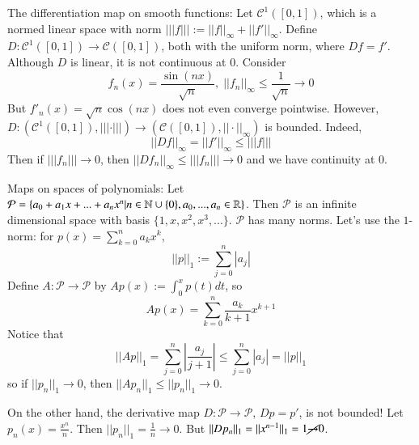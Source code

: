\begin{example}
    The differentiation map on smooth functions: Let $\mathcal{C}^1([0,1])$, which is a normed linear space with norm $|||f||| := ||f||_{\infty} + ||f'||_{\infty}$. Define $D:\mathcal{C}^1([0,1])\rightarrow \mathcal{C}([0,1])$, both with the uniform norm, where $Df = f'$. Although $D$ is linear, it is not continuous at $0$. Consider $$f_n(x) = \frac{\sin(nx)}{\sqrt{n}},\;||f_n||_{\infty} \leq \frac{1}{\sqrt{n}}\rightarrow 0$$ But $f'_n(x) = \sqrt{n}\cos(nx)$ does not even converge pointwise. However, $D:(\mathcal{C}^1([0,1]),|||\cdot|||)\rightarrow (\mathcal{C}([0,1]),||\cdot||_{\infty})$ is bounded. Indeed, $$||Df||_{\infty} = ||f'||_{\infty} \leq |||f|||$$ Then if $|||f_n|||\rightarrow 0$, then $||Df_n||_{\infty} \leq |||f_n|||\rightarrow 0$ and we have continuity at $0$.
\end{example}

\begin{example}
    Maps on spaces of polynomials: Let $\mathcal{P} = \{a_0+a_1x+...+a_nx^n\vert n\in \mathbb N\cup\{0\},a_0,...,a_n \in \mathbb R\}$. Then $\mathcal{P}$ is an infinite dimensional space with basis $\{1,x,x^2,x^3,...\}$. $\mathcal{P}$ has many norms. Let's use the $1$-norm: for $p(x) = \sum_{k=0}^na_kx^k$, $$||p||_1 := \sum_{j=0}^n|a_j|$$ Define $A:\mathcal{P}\rightarrow \mathcal{P}$ by $Ap(x) := \int_0^xp(t)dt$, so $$Ap(x) = \sum_{k=0}^n\frac{a_k}{k+1}x^{k+1}$$ Notice that $$||Ap||_1 = \sum_{j=0}^n\left|\frac{a_j}{j+1}\right| \leq \sum_{j=0}^n|a_j| = ||p||_1$$ so if $||p_n||_1\rightarrow 0$, then $||Ap_n||_1\leq ||p_n||_1\rightarrow 0$. 

    On the other hand, the derivative map $D:\mathcal{P}\rightarrow \mathcal{P}$, $Dp = p'$, is not bounded! Let $p_n(x) = \frac{x^n}{n}$. Then $||p_n||_1 = \frac{1}{n}\rightarrow 0$. But $||Dp_n||_1 = ||x^{n-1}||_1 = 1\cancel{\rightarrow}0$. 
\end{example}

